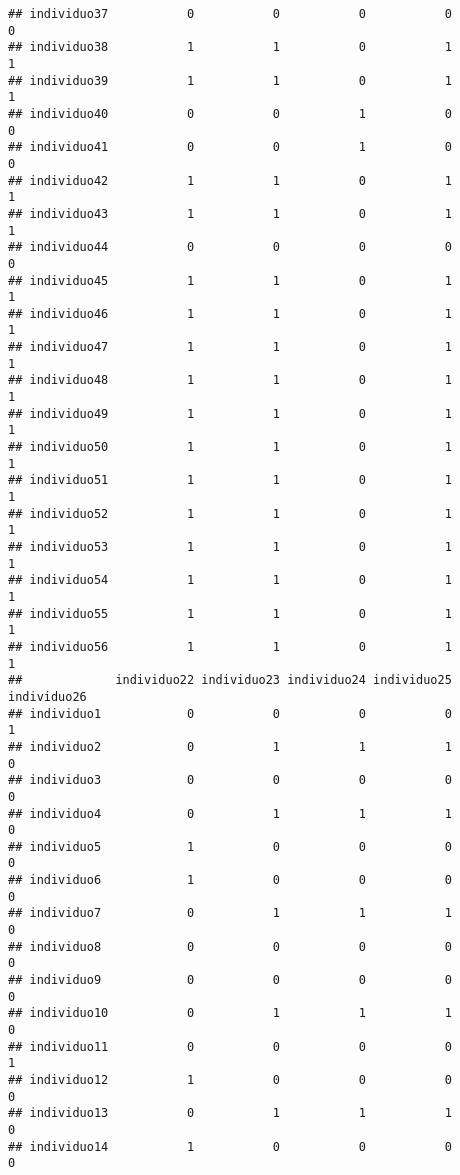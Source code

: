 \documentclass[
]{article}
\begin{document}
\begin{verbatim}
## individuo37           0           0           0           0           0
## individuo38           1           1           0           1           1
## individuo39           1           1           0           1           1
## individuo40           0           0           1           0           0
## individuo41           0           0           1           0           0
## individuo42           1           1           0           1           1
## individuo43           1           1           0           1           1
## individuo44           0           0           0           0           0
## individuo45           1           1           0           1           1
## individuo46           1           1           0           1           1
## individuo47           1           1           0           1           1
## individuo48           1           1           0           1           1
## individuo49           1           1           0           1           1
## individuo50           1           1           0           1           1
## individuo51           1           1           0           1           1
## individuo52           1           1           0           1           1
## individuo53           1           1           0           1           1
## individuo54           1           1           0           1           1
## individuo55           1           1           0           1           1
## individuo56           1           1           0           1           1
##             individuo22 individuo23 individuo24 individuo25 individuo26
## individuo1            0           0           0           0           1
## individuo2            0           1           1           1           0
## individuo3            0           0           0           0           0
## individuo4            0           1           1           1           0
## individuo5            1           0           0           0           0
## individuo6            1           0           0           0           0
## individuo7            0           1           1           1           0
## individuo8            0           0           0           0           0
## individuo9            0           0           0           0           0
## individuo10           0           1           1           1           0
## individuo11           0           0           0           0           1
## individuo12           1           0           0           0           0
## individuo13           0           1           1           1           0
## individuo14           1           0           0           0           0

\end{verbatim}
\end{document}
